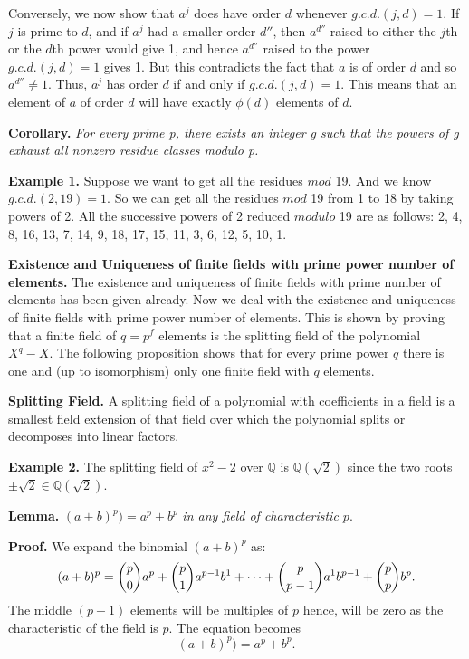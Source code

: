 \documentclass[12pt]{article}
\begin{document}
Conversely, we now show that $a^j$ does have order $d$ whenever $g.c.d.(j,d)=1$. If $j$ is prime to $d$, and if $a^j$ had a smaller order $d''$, then $a^{d''}$ raised to either the $j$th or the $d$th power would give 1, and hence $a^{d''}$ raised to the power $g.c.d.(j,d)=1$ gives 1. But this contradicts the fact that $a$ is of order $d$ and so $a^{d''} \neq 1$. Thus, $a^j$ has order $d$ if and only if $g.c.d.(j,d)=1$. This means that an element of $a$ of order $d$ will have exactly $\phi(d)$ elements of $d$.

\textbf{Corollary.}
\textit{For every prime p, there exists an integer g such that the powers of g exhaust all nonzero residue classes modulo p.}

\textbf{Example 1.} Suppose we want to get all the residues $mod $
19. And we know $g.c.d.(2,19)=1$. So we can get all the residues
$mod$ 19 from 1 to 18 by taking powers of 2. All the successive
powers of 2 reduced $modulo$ 19 are as follows: 2, 4, 8, 16, 13, 7,
14, 9, 18, 17, 15, 11, 3, 6, 12, 5, 10, 1.

\textbf{Existence and Uniqueness of finite fields with prime power number of elements.} The existence and uniqueness of finite fields with prime number of elements has been given already. Now we deal with the existence and uniqueness of finite fields with prime power number of elements. This is shown by proving that a finite field of $q=p^f$ elements is the splitting field of the polynomial $X^q-X$. The following proposition shows that for every prime power $q$ there is one and (up to isomorphism) only one finite field with $q$ elements.

\textbf{Splitting Field.}
A splitting field of a polynomial with coefficients in a field is a smallest field extension of that field over which the polynomial splits or decomposes into linear factors.

\textbf{Example 2.} The splitting field of $x^2-2$ over $\mathbb{Q}$
is $\mathbb{Q}(\sqrt{2})$ since the two roots $\pm \sqrt{2} \in
\mathbb{Q}(\sqrt{2})$.

\textbf{Lemma.}
$(a+b)^p)=a^p+b^p$ \textit{in any field of characteristic $p.$}

\textbf{Proof.} We expand the binomial $(a+b)^p$ as:
$$(a+b)^p= \dbinom{p}{0}a^p + \dbinom{p}{1}a^{p-1} b^1 + \cdots + \dbinom{p}{p-1} a^1 b^{p-1}+ \dbinom{p}{p} b^p.$$
The middle $(p-1)$ elements will be multiples of $p$ hence, will be
zero as the characteristic of the field is $p$. The equation becomes
$$(a+b)^p)=a^p+b^p.$$
\end{document}

